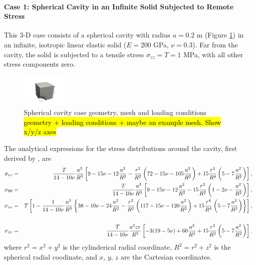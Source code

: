 \documentclass[sn-mathphys,Numbered,draft]{sn-jnl}%
\begin{document}
\paragraph{Case 1: Spherical Cavity in an Infinite Solid Subjected to Remote Stress}
This 3-D case consists of a spherical cavity with radius $a = 0.2$ m (Figure \ref{fig:spherical_cavity}) in an infinite, isotropic linear elastic solid ($E = 200$ GPa, $\nu = 0.3$).
Far from the cavity, the solid is subjected to a tensile stress $\sigma_{zz} = T = 1$ MPa, with all other stress components zero.
\begin{figure}[htbp]
   \centering
   \includegraphics[width=0.2\textwidth]{figures/spherical_cavity.pdf} 
   \caption{Spherical cavity case geometry, mesh and loading conditions \hl{geometry + loading conditions + maybe an example mesh. Show x/y/z axes}}
   \label{fig:spherical_cavity}
\end{figure}
The analytical expressions for the stress distributions around the cavity, first derived by \cite{Southwell1926}, are
\begin{eqnarray}
	\sigma_{rr} &=&
		\frac{T}{14 - 10\nu} \frac{a^3}{R^3}
		\left[ 9 - 15\nu - 12 \frac{a^2}{R^2}  - \frac{r^2}{R^2} \left( 72 - 15\nu - 105 \frac{a^2}{R^2} \right) + 15 \frac{r^4}{R^4} \left( 5 - 7 \frac{a^2}{R^2} \right) \right], \\
	\sigma_{\theta\theta} &=&
		\frac{T}{14 - 10\nu} \frac{a^3}{R^3}
		\left[ 9 - 15\nu - 12 \frac{a^2}{R^2}  - 15 \frac{r^2}{R^2} \left( 1 - 2\nu - \frac{a^2}{R^2} \right) \right], \\
	\sigma_{zz} &=&
		T \left[ 1 - \frac{1}{14 - 10\nu} \frac{a^3}{R^3} \left\{ 38 - 10\nu - 24 \frac{a^2}{R^2} 
		- \frac{r^2}{R^2} \left( 117 - 15\nu - 120 \frac{a^2}{R^2} \right)
		+ 15 \frac{r^4}{R^4} \left( 5 - 7 \frac{a^2}{R^2} \right) \right\} \right], \notag \\
		\\
	\sigma_{zr} &=&
	\frac{T}{14 - 10\nu} \frac{a^3 z r}{R^5}
	\left[ -3(19 - 5\nu) + 60 \frac{a^2}{R^2} + 15 \frac{r^2}{R^2} \left( 5 - 7 \frac{a^2}{R^2} \right)  \right].
\end{eqnarray}
where $r^2 = x^2 + y^2$ is the cylinderical radial coordinate, $R^2 = r^2 + z^2$ is the spherical radial coodinate, and $x$, $y$, $z$ are the Cartesian coordinates.
\end{document}
